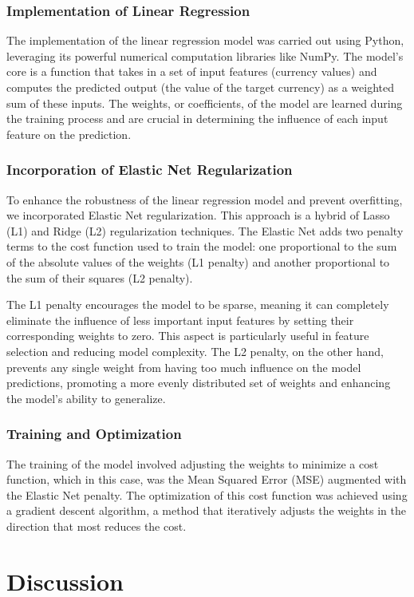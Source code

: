 \documentclass[conference]{IEEEtran}
\begin{document}
\subsubsection{Implementation of Linear Regression}
The implementation of the linear regression model was carried out using Python, leveraging its powerful numerical computation libraries like NumPy. The model's core is a function that takes in a set of input features (currency values) and computes the predicted output (the value of the target currency) as a weighted sum of these inputs. The weights, or coefficients, of the model are learned during the training process and are crucial in determining the influence of each input feature on the prediction.

\subsubsection{Incorporation of Elastic Net Regularization}
To enhance the robustness of the linear regression model and prevent overfitting, we incorporated Elastic Net regularization. This approach is a hybrid of Lasso (L1) and Ridge (L2) regularization techniques. The Elastic Net adds two penalty terms to the cost function used to train the model: one proportional to the sum of the absolute values of the weights (L1 penalty) and another proportional to the sum of their squares (L2 penalty).

The L1 penalty encourages the model to be sparse, meaning it can completely eliminate the influence of less important input features by setting their corresponding weights to zero. This aspect is particularly useful in feature selection and reducing model complexity. The L2 penalty, on the other hand, prevents any single weight from having too much influence on the model predictions, promoting a more evenly distributed set of weights and enhancing the model's ability to generalize.

\subsubsection{Training and Optimization}
The training of the model involved adjusting the weights to minimize a cost function, which in this case, was the Mean Squared Error (MSE) augmented with the Elastic Net penalty. The optimization of this cost function was achieved using a gradient descent algorithm, a method that iteratively adjusts the weights in the direction that most reduces the cost.

\section{Discussion}
\end{document}
